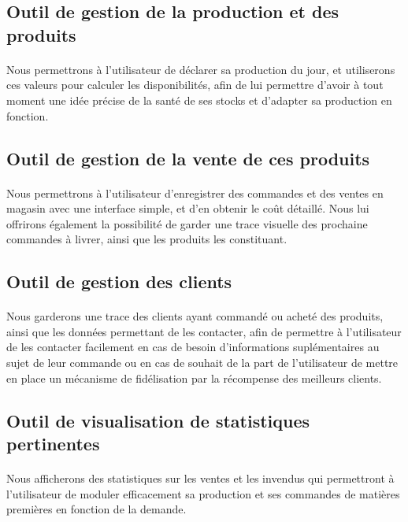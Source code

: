     \subsection{Outil de gestion de la production et des produits}
        \paragraph{}
            Nous permettrons à l'utilisateur de déclarer sa production du jour,
            et utiliserons ces valeurs pour calculer les disponibilités, afin de
            lui permettre d'avoir à tout moment une idée précise de la santé de
            ses stocks et d'adapter sa production en fonction.
    \subsection{Outil de gestion de la vente de ces produits}
        \paragraph{}
            Nous permettrons à l'utilisateur d'enregistrer des commandes et des
            ventes en magasin avec une interface simple, et d'en obtenir le
            coût détaillé.
            Nous lui offrirons également la possibilité de garder une trace
            visuelle des prochaine commandes à livrer, ainsi que les produits
            les constituant.
    \subsection{Outil de gestion des clients}
        \paragraph{}
            Nous garderons une trace des clients ayant commandé ou acheté des
            produits, ainsi que les données permettant de les contacter,
            afin de permettre à l'utilisateur de les contacter facilement en
            cas de besoin d'informations suplémentaires au sujet de leur
            commande ou en cas de souhait de la part de l'utilisateur de mettre
            en place un mécanisme de fidélisation par la récompense des
            meilleurs clients.
    \subsection{Outil de visualisation de statistiques pertinentes}
        \paragraph{}
            Nous afficherons des statistiques sur les ventes et les invendus qui
            permettront à l'utilisateur de moduler efficacement sa production et
            ses commandes de matières premières en fonction de la demande.